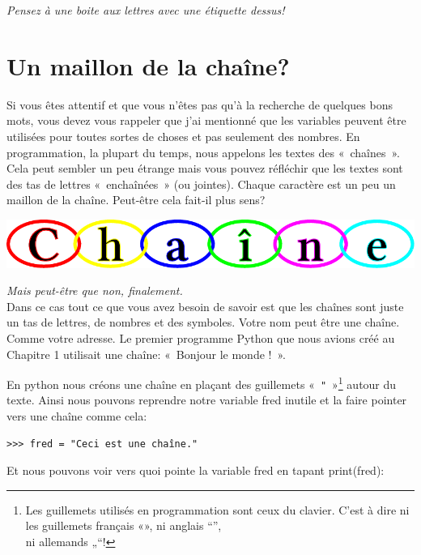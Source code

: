 \emph{Pensez à une boite aux lettres avec une étiquette dessus!}



\section{Un maillon de la chaîne?}

Si vous êtes attentif et que vous n'êtes pas qu'à la recherche de quelques bons mots, vous devez vous rappeler que j'ai mentionné que les variables peuvent être utilisées  pour toutes sortes de choses et pas seulement des nombres.
En programmation, la plupart du temps, nous appelons les textes des «~chaînes~». Cela peut sembler un peu étrange mais vous pouvez réfléchir que les textes sont des tas de lettres «~enchaînées~» (ou jointes). Chaque caractère est un peu un maillon de la chaîne. Peut-être cela fait-il plus sens?\\
\begin{center}
\includegraphics[scale=1]{images/chaine.pdf} 
\end{center}

\emph{Mais peut-être que non, finalement.}\\


Dans ce cas tout ce que vous avez besoin de savoir est que les chaînes sont juste un tas de lettres, de nombres et 
 des symboles. Votre nom peut être une chaîne. Comme votre adresse. Le premier programme Python que nous avions créé au Chapitre 1 utilisait une chaîne: «~Bonjour le monde !~». 


En python nous créons une chaîne en plaçant des guillemets «~\texttt{"}~»\footnote{Les guillemets utilisés en programmation sont ceux du clavier. C'est à dire ni les guillemets français «», ni anglais “”,\\ ni allemands  „“!} autour du texte. Ainsi nous pouvons reprendre notre variable 
fred inutile et la faire pointer vers une chaîne comme cela:

\begin{Verbatim}[frame=single,rulecolor=\color{mbleu}, label=à taper]
>>> fred = "Ceci est une chaîne."
\end{Verbatim}

Et nous pouvons voir vers quoi pointe la variable fred en tapant print(fred):

